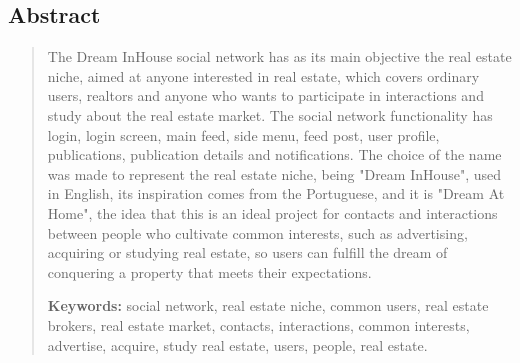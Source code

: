 \documentclass[a4paper,12pt]{article}
\begin{document}
\begin{centering}
    \section*{Abstract}
    \begin{quotation}
        The Dream InHouse social network has as its main objective the real estate niche, aimed at anyone interested in real estate, which covers ordinary users, realtors and anyone who wants to participate in interactions and study about the real estate market. The social network functionality has login, login screen, main feed, side menu, feed post, user profile, publications, publication details and notifications. The choice of the name was made to represent the real estate niche, being "Dream InHouse", used in English, its inspiration comes from the Portuguese, and it is "Dream At Home", the idea that this is an ideal project for contacts and interactions between people who cultivate common interests, such as advertising, acquiring or studying real estate, so users can fulfill the dream of conquering a property that meets their expectations. 

        \textbf{Keywords:} social network, real estate niche, common users, real estate brokers, real estate market, contacts, interactions, common interests, advertise, acquire, study real estate, users, people, real estate.
    \end{quotation}
\end{centering}
\pagebreak
\listoffigures
\pagebreak
\tableofcontents
\pagebreak

\pagebreak

\pagebreak

\pagebreak

\pagebreak

\pagebreak

\pagebreak

\pagebreak

\end{document}
